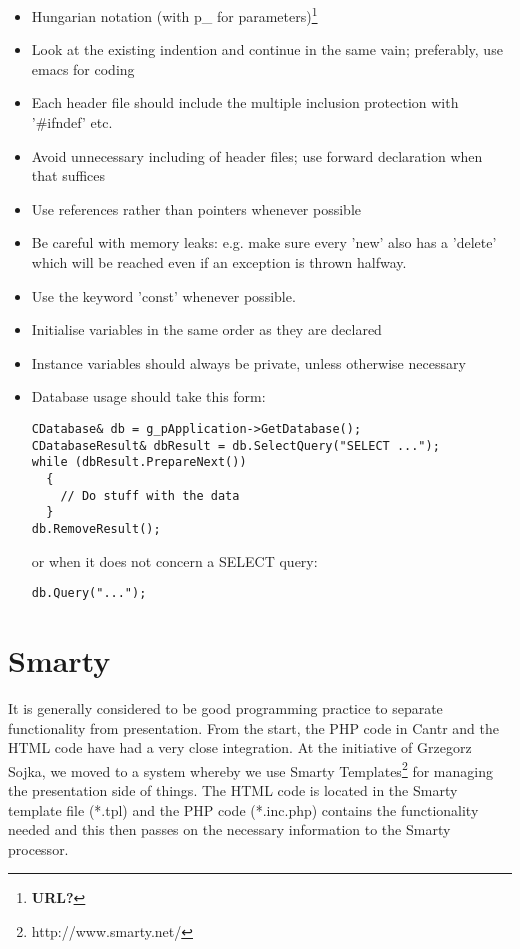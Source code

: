 \documentclass[a4paper,12pt]{article}
\begin{document}
\begin{itemize}
\item Hungarian notation (with p\_ for parameters)\footnote{\bf URL?}
\item Look at the existing indention and continue in the same vain; preferably, use emacs for coding
\item Each header file should include the multiple inclusion protection with '\#ifndef' etc.
\item  Avoid unnecessary including of header files; use forward declaration when that suffices
\item Use references rather than pointers whenever possible
\item Be careful with memory leaks: e.g. make sure every 'new' also has a 'delete' which will be reached even if an exception is thrown halfway.
\item Use the keyword 'const' whenever possible.
\item Initialise variables in the same order as they are declared
\item Instance variables should always be private, unless otherwise necessary
\item Database usage should take this form:
\begin{verbatim}
CDatabase& db = g_pApplication->GetDatabase();
CDatabaseResult& dbResult = db.SelectQuery("SELECT ...");
while (dbResult.PrepareNext())
  {
    // Do stuff with the data
  }
db.RemoveResult();
\end{verbatim}
or when it does not concern a SELECT query:
\begin{verbatim}
db.Query("...");
\end{verbatim}
\end{itemize}

\section{Smarty}

It is generally considered to be good programming practice to separate functionality from presentation. From the start, the PHP code in Cantr and the HTML code have had a very close integration. At the initiative of Grzegorz Sojka, we moved to a system whereby we use Smarty Templates\footnote{http://www.smarty.net/} for managing the presentation side of things. The HTML code is located in the Smarty template file (*.tpl) and the PHP code (*.inc.php) contains the functionality needed and this then passes on the necessary information to the Smarty processor.
\end{document}

